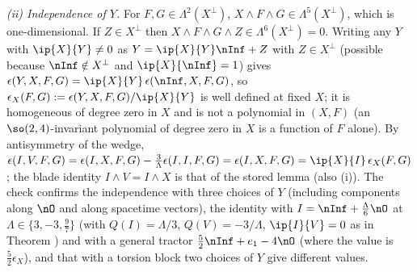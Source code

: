 \emph{(ii) Independence of $Y$.} For $F, G \in \Lambda^{2}(X^{\perp})$, $X \wedge F \wedge G \in \Lambda^{5}(X^{\perp})$, which is one-dimensional. If $Z \in X^{\perp}$ then $X \wedge F \wedge G \wedge Z \in \Lambda^{6}(X^{\perp}) = 0$. Writing any $Y$ with $\ip{X}{Y} \neq 0$ as $Y = \ip{X}{Y}\nInf + Z$ with $Z \in X^{\perp}$ (possible because $\nInf \notin X^{\perp}$ and $\ip{X}{\nInf} = 1$) gives $\epsilon(Y, X, F, G) = \ip{X}{Y}\,\epsilon(\nInf, X, F, G)$, so $\epsilon_{X}(F, G) := \epsilon(Y, X, F, G)/\ip{X}{Y}$ is well defined at fixed $X$; it is homogeneous of degree zero in $X$ and is not a polynomial in $(X, F)$ (an $\so(2,4)$-invariant polynomial of degree zero in $X$ is a function of $F$ alone). By antisymmetry of the wedge, $\epsilon(I, V, F, G) = \epsilon(I, X, F, G) - \tfrac{3}{\Lambda}\epsilon(I, I, F, G) = \epsilon(I, X, F, G) = \ip{X}{I}\,\epsilon_{X}(F, G)$; the blade identity $I \wedge V = I \wedge X$ is that of the stored lemma (also (i)). The check confirms the independence with three choices of $Y$ (including components along $\nO$ and along spacetime vectors), the identity with $I = \nInf + \tfrac{\Lambda}{6}\nO$ at $\Lambda \in \{3, -3, \tfrac97\}$ (with $Q(I) = \Lambda/3$, $Q(V) = -3/\Lambda$, $\ip{I}{V} = 0$ as in Theorem ) and with a general tractor $\tfrac52\nInf + e_{1} - 4\nO$ (where the value is $\tfrac52\epsilon_{X}$), and that with a torsion block two choices of $Y$ give different values.

